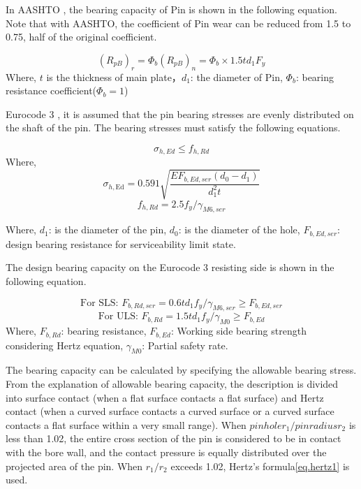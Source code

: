In AASHTO \cite{AASHTO2020}, the bearing capacity of Pin is shown in the following equation. Note that with AASHTO, the coefficient of Pin wear can be reduced from 1.5 to 0.75, half of the original coefficient.

    \begin{equation}
        (R_{pB})_r = \Phi_b(R_{pB})_n = \Phi_b \times 1.5td_1F_y
    \end{equation}
Where, $t$ is the thickness of main plate，$d_1$: the diameter of Pin, $\Phi_b$: bearing resistance coefficient($\Phi_b = 1$) 

Eurocode 3 \cite{eurocode3-21}, it is assumed that the pin bearing stresses are evenly distributed on the shaft of the pin. The bearing stresses must satisfy the following equations.

    \begin{equation}
        \sigma_{h,Ed} 	\leq f_{h,Rd}
    \end{equation}
Where,
    \begin{equation}
        \sigma_{h, \mathrm{Ed}}=0.591 \sqrt{\dfrac{E F_{b, E d, s e r}\left(d_{0}-d_1\right)}{d_1^{2} t}}
    \end{equation}
    \begin{equation}
        f_{h,Rd} = 2.5f_y/\gamma_{M6,ser}
    \end{equation}

Where, $d_1$: is the diameter of the pin, $d_0$: is the diameter of the hole, $F_{b,Ed,ser}$: design bearing resistance for serviceability limit state.

The design bearing capacity on the Eurocode 3 resisting side is shown in the following equation.

    \begin{equation}
        \text{For SLS: } F_{b,Rd,ser} = 0.6td_1 f_y/\gamma_{M6,ser} \geq F_{b,Ed,ser}
    \end{equation}
    \begin{equation}
        \text{For ULS: } F_{b,Rd} = 1.5td_1 f_y/\gamma_{M0} \geq F_{b,Ed}
    \end{equation}
Where, $F_{b,Rd}$: bearing resistance, $F_{b,Ed}$: Working side bearing strength considering Hertz equation, $\gamma_{M0}$: Partial safety rate.

The bearing capacity can be calculated by specifying the allowable bearing stress. From the explanation of allowable bearing capacity, the description is divided into surface contact (when a flat surface contacts a flat surface) and Hertz contact \cite{hertz1882Ueber} (when a curved surface contacts a curved surface or a curved surface contacts a flat surface within a very small range). When $pin hole r_1 / pin radius r_2$ is less than 1.02, the entire cross section of the pin is considered to be in contact with the bore wall, and the contact pressure is equally distributed over the projected area of the pin. When $r_1 / r_2$ exceeds 1.02, Hertz's formula\ref{eq.hertz1} is used.

